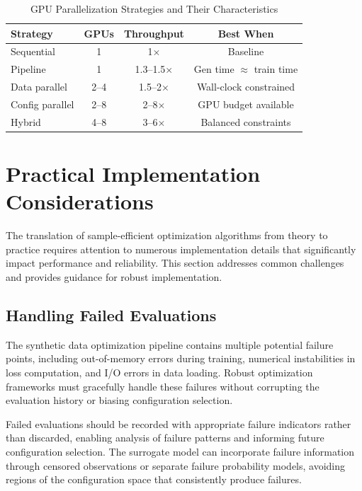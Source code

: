 \begin{table}[htbp]
\centering
\caption{GPU Parallelization Strategies and Their Characteristics}
\label{tab:parallelization}
\begin{tabular}{lccc}
\hline
\textbf{Strategy} & \textbf{GPUs} & \textbf{Throughput} & \textbf{Best When} \\
\hline
Sequential & 1 & 1$\times$ & Baseline \\
Pipeline & 1 & 1.3--1.5$\times$ & Gen time $\approx$ train time \\
Data parallel & 2--4 & 1.5--2$\times$ & Wall-clock constrained \\
Config parallel & 2--8 & 2--8$\times$ & GPU budget available \\
Hybrid & 4--8 & 3--6$\times$ & Balanced constraints \\
\hline
\end{tabular}
\end{table}

\section{Practical Implementation Considerations}
\label{sec:practical_implementation}

The translation of sample-efficient optimization algorithms from theory to practice requires attention to numerous implementation details that significantly impact performance and reliability. This section addresses common challenges and provides guidance for robust implementation.

\subsection{Handling Failed Evaluations}

The synthetic data optimization pipeline contains multiple potential failure points, including out-of-memory errors during training, numerical instabilities in loss computation, and I/O errors in data loading. Robust optimization frameworks must gracefully handle these failures without corrupting the evaluation history or biasing configuration selection.

Failed evaluations should be recorded with appropriate failure indicators rather than discarded, enabling analysis of failure patterns and informing future configuration selection. The surrogate model can incorporate failure information through censored observations or separate failure probability models, avoiding regions of the configuration space that consistently produce failures.

